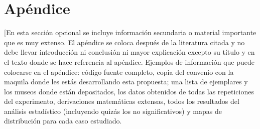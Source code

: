 \section{Apéndice}
[En esta sección opcional se incluye información secundaria o material importante que es muy extenso. El apéndice se coloca después de la literatura citada y no debe llevar introducción ni conclusión ni mayor explicación excepto su título y en el texto donde se hace referencia al apéndice. 
Ejemplos de información que puede colocarse en el apéndice: código fuente completo, copia del  convenio con la maquila donde les estás desarrollando esta propuesta; una lista de ejemplares y los museos donde están depositados, los datos obtenidos de todas las repeticiones del experimento, derivaciones matemáticas extensas, todos los resultados del análisis estadístico (incluyendo quizás los no significativos) y mapas de distribución para cada caso estudiado. 

